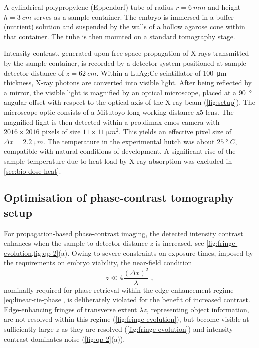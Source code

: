 \documentclass[
twoside,
openright,
titlepage,
numbers=noenddot,
headinclude,
fleqn,
a4paper,
footinclude=true,
cleardoublepage=empty,
abstractoff,
BCOR=5mm,
paper=a4,
fontsize=11pt,
british,ngerman,american,
]{scrreprt}
\begin{document}
A cylindrical polypropylene (Eppendorf) tube of radius $r =\SI{6}{mm}$
and height $h = \SI{3}{cm}$ serves as a sample container.  The embryo
is immersed in a buffer (nutrient) solution and suspended by the walls
of a hollow agarose cone within that container.  The tube is then
mounted on a standard tomography stage.

Intensity contrast, generated upon free-space propagation of X-rays
transmitted by the sample container, is recorded by a detector system
positioned at sample-detector distance of $z = \SI{62}{cm}$.  Within a
LuAg:Ce scintillator of \SI{100}{\micro m} thickness, X-ray photons
are converted into visible light.  After being reflected by a mirror,
the visible light is magnified by an optical microscope, placed at a
\SI{90}{\degree} angular offset with respect to the optical axis of
the X-ray beam (\cref{fig:setup}).  The microscope optic consists of a
Mitutoyo long working distance x5 lens.  The magnified light is then
detected within a pco.dimax \ac{cmos} camera with
$\num{2016}\times\num{2016}$ pixels of size
$\num{11}\times\SI{11}{\micro m^2}$.  This yields an effective pixel
size of $\Delta x =\SI{2.2}{\micro m}$.  The temperature in the
experimental hutch was about $\SI{25}{\degree.C}$, compatible with
natural conditions of development.  A significant rise of the sample
temperature due to heat load by X-ray absorption was excluded in
\cref{sec:bio-dose-heat}.


\subsection[\texorpdfstring{Optimisation of phase-contrast\\
  tomography setup}{Optimisation of phase-contrast tomography
  setup}]{Optimisation of phase-contrast tomography setup}
\label{sec:optimisation}

For propagation-based phase-contrast imaging, the detected intensity
contrast enhances when the sample-to-detector distance $z$ is
increased, see \cref{fig:fringe-evolution,fig:qp-2}(a).  Owing to
severe constraints on exposure times, imposed by the requirements on
embryo viability, the near-field condition
\begin{equation}
  \label{eq:near-field-condition}
  z \ll 4 \frac{(\Delta x)^2}{\lambda} \;,
\end{equation}
nominally required for phase retrieval within the edge-enhancement
regime \cref{eq:linear-tie-phase}, is deliberately violated for the
benefit of increased contrast.  Edge-enhancing fringes of transverse
extent $\lambda z$, representing object information, are not resolved
within this regime (\cref{fig:fringe-evolution}), but become visible
at sufficiently large $z$ as they are resolved
(\cref{fig:fringe-evolution}) and intensity contrast dominates noise
(\cref{fig:qp-2}(a)).
\end{document}
